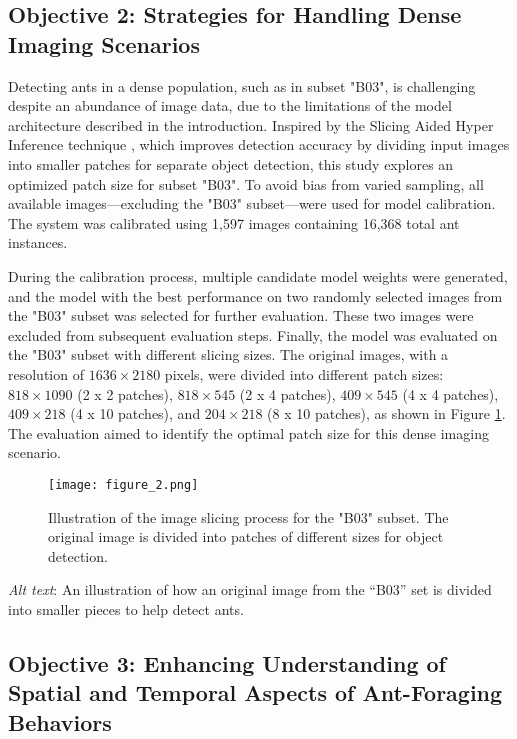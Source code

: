 \subsection{Objective 2: Strategies for Handling Dense Imaging Scenarios}
Detecting ants in a dense population, such as in subset "B03", is challenging despite an abundance of image data, due to the limitations of the model architecture described in the introduction. Inspired by the Slicing Aided Hyper Inference technique \cite{Akyon2022Slicing}, which improves detection accuracy by dividing input images into smaller patches for separate object detection, this study explores an optimized patch size for subset "B03". To avoid bias from varied sampling, all available images—excluding the "B03" subset—were used for model calibration. The system was calibrated using 1,597 images containing 16,368 total ant instances.

During the calibration process, multiple candidate model weights were generated, and the model with the best performance on two randomly selected images from the "B03" subset was selected for further evaluation. These two images were excluded from subsequent evaluation steps. Finally, the model was evaluated on the "B03" subset with different slicing sizes. The original images, with a resolution of $1636 \times 2180$ pixels, were divided into different patch sizes: $818 \times 1090$ (2 x 2 patches), $818 \times 545$ (2 x 4 patches), $409 \times 545$ (4 x 4 patches), $409 \times 218$ (4 x 10 patches), and $204 \times 218$ (8 x 10 patches), as shown in Figure \ref{fig:figure2}. The evaluation aimed to identify the optimal patch size for this dense imaging scenario.

\begin{figure}[H]
    \centering
    \texttt{[image: figure\_2.png]}
    \caption{Illustration of the image slicing process for the "B03" subset. The original image is divided into patches of different sizes for object detection.}
    \label{fig:figure2}
\end{figure}

\textit{Alt text}: An illustration of how an original image from the “B03” set is divided into smaller pieces to help detect ants.

\subsection{Objective 3: Enhancing Understanding of Spatial and Temporal Aspects of Ant-Foraging Behaviors}

